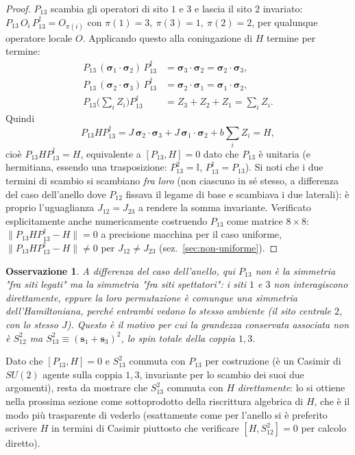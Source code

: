 \documentclass[11pt,a4paper]{article}
\newtheorem{osservazione}{Osservazione}
\begin{document}
\begin{proof}
$P_{13}$ scambia gli operatori di sito $1$ e $3$ e lascia il sito $2$
invariato: $P_{13}\,O_i\,P_{13}^\dagger = O_{\pi(i)}$ con $\pi(1)=3,\ \pi(3)=1,\ \pi(2)=2$,
per qualunque operatore locale $O$. Applicando questo alla coniugazione di
$H$ termine per termine:
\begin{align}
P_{13}\,(\boldsymbol\sigma_1\cdot\boldsymbol\sigma_2)\,P_{13}^\dagger &= \boldsymbol\sigma_3\cdot\boldsymbol\sigma_2 = \boldsymbol\sigma_2\cdot\boldsymbol\sigma_3,\\
P_{13}\,(\boldsymbol\sigma_2\cdot\boldsymbol\sigma_3)\,P_{13}^\dagger &= \boldsymbol\sigma_2\cdot\boldsymbol\sigma_1 = \boldsymbol\sigma_1\cdot\boldsymbol\sigma_2,\\
P_{13}\Big(\sum_i Z_i\Big)P_{13}^\dagger &= Z_3+Z_2+Z_1 = \sum_i Z_i.
\end{align}
Quindi
\[
P_{13} H P_{13}^\dagger = J\,\boldsymbol\sigma_2\cdot\boldsymbol\sigma_3 + J\,\boldsymbol\sigma_1\cdot\boldsymbol\sigma_2 + b\sum_i Z_i = H,
\]
cioè $P_{13}HP_{13}^\dagger=H$, equivalente a $[P_{13},H]=0$ dato che $P_{13}$
è unitaria (e hermitiana, essendo una trasposizione: $P_{13}^2=\mathbb{I}$,
$P_{13}^\dagger=P_{13}$). Si noti che i due termini di scambio si scambiano
\emph{fra loro} (non ciascuno in sé stesso, a differenza del caso
dell'anello dove $P_{12}$ fissava il legame di base e scambiava i due
laterali): è proprio l'uguaglianza $J_{12}=J_{23}$ a rendere la somma
invariante. Verificato esplicitamente anche numericamente costruendo
$P_{13}$ come matrice $8\times8$: $\|P_{13}HP_{13}^\dagger-H\|=0$ a
precisione macchina per il caso uniforme, $\|P_{13}HP_{13}^\dagger-H\|\neq0$
per $J_{12}\neq J_{23}$ (sez.~\ref{sec:non-uniforme}).
\end{proof}

\begin{osservazione}
A differenza del caso dell'anello, qui $P_{13}$ non è la simmetria "fra siti
legati" ma la simmetria "fra siti spettatori": i siti $1$ e $3$ non
interagiscono direttamente, eppure la loro permutazione è comunque una
simmetria dell'Hamiltoniana, perché entrambi vedono lo stesso ambiente (il
sito centrale $2$, con lo stesso $J$). Questo è il motivo per cui la
grandezza conservata associata non è $S_{12}^2$ ma $S_{13}^2\equiv(\mathbf
s_1+\mathbf s_3)^2$, lo spin totale della coppia $1,3$.
\end{osservazione}

Dato che $[P_{13},H]=0$ e $S_{13}^2$ commuta con $P_{13}$ per costruzione
(è un Casimir di $SU(2)$ agente sulla coppia $1,3$, invariante per lo
scambio dei suoi due argomenti), resta da mostrare che $S_{13}^2$ commuta
con $H$ \emph{direttamente}: lo si ottiene nella prossima sezione come
sottoprodotto della riscrittura algebrica di $H$, che è il modo più
trasparente di vederlo (esattamente come per l'anello si è preferito
scrivere $H$ in termini di Casimir piuttosto che verificare $[H,S_{12}^2]=0$
per calcolo diretto).
\end{document}
